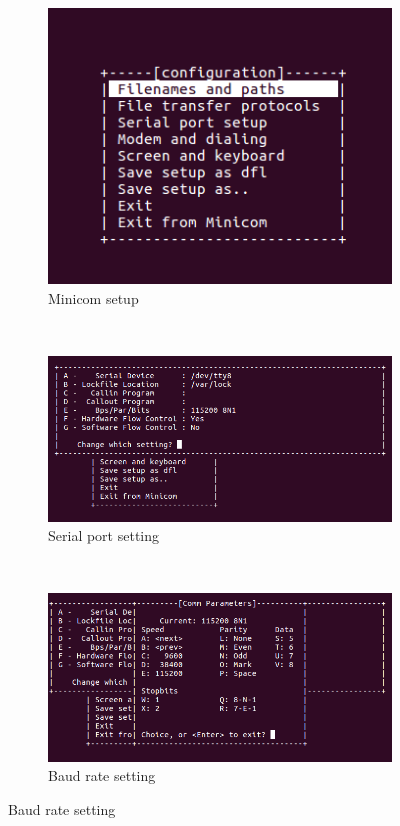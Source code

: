 \documentclass[12pt,a4paper]{report}
\begin{document}
\begin{figure}[H]
    \centering
    \begin{subfigure}[b]{0.3\textwidth}
        \includegraphics[width=\textwidth]{figs/minicom.png}
        \caption{Minicom setup}
        \label{fig:miniSetup}
    \end{subfigure}
    ~
    \begin{subfigure}[b]{0.3\textwidth}
        \includegraphics[width=\textwidth]{figs/serialPort.png}
        \caption{Serial port setting}
        \label{fig:serial}
    \end{subfigure}
    ~
    \begin{subfigure}[b]{0.3\textwidth}
        \includegraphics[width=\textwidth]{figs/baud-rate.png}
        \caption{Baud rate setting}
        \label{fig:baud}
    \end{subfigure}
\end{figure}
\end{document}
